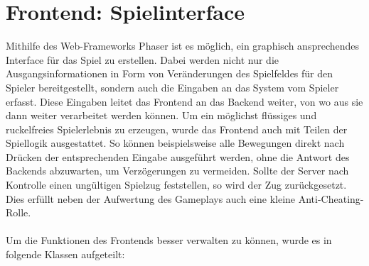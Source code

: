 \documentclass[conference]{IEEEtran}
\begin{document}
\section{Frontend: Spielinterface}
Mithilfe des Web-Frameworks Phaser ist es möglich, ein graphisch ansprechendes Interface für das Spiel zu erstellen. Dabei werden nicht nur die Ausgangsinformationen in Form von Veränderungen des Spielfeldes für den Spieler bereitgestellt, sondern auch die Eingaben an das System vom Spieler erfasst. Diese Eingaben leitet das Frontend an das Backend weiter, von wo aus sie dann weiter verarbeitet werden können. Um ein möglichst flüssiges und ruckelfreies Spielerlebnis zu erzeugen, wurde das Frontend auch mit Teilen der Spiellogik ausgestattet. So können beispielsweise alle Bewegungen direkt nach Drücken der entsprechenden Eingabe ausgeführt werden, ohne die Antwort des Backends abzuwarten, um Verzögerungen zu vermeiden. Sollte der Server nach Kontrolle einen ungültigen Spielzug feststellen, so wird der Zug zurückgesetzt. Dies erfüllt neben der Aufwertung des Gameplays auch eine kleine Anti-Cheating-Rolle.
\\
\\
Um die Funktionen des Frontends besser verwalten zu können, wurde es in folgende Klassen aufgeteilt:
\end{document}
